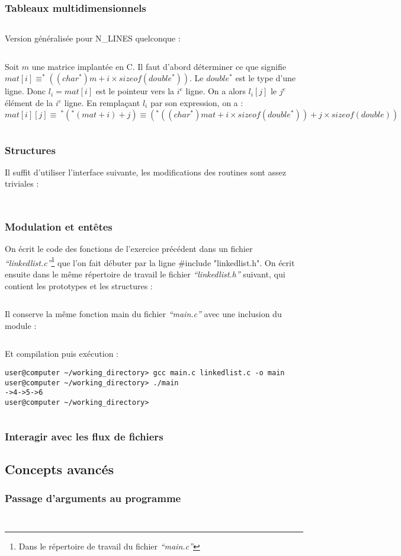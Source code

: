 \documentclass[../main.tex]{subfiles}
\begin{document}
\subsubsection{Tableaux multidimensionnels}
\inputminted{c}{solutions/tab_display_2d.c}
\newline
Version généralisée pour \textsf{N\_LINES} quelconque : 
\inputminted{c}{solutions/triangle.c}
 \newline
Soit $m$ une matrice implantée en C. Il faut d'abord déterminer ce que signifie $mat[i] \equiv ^*((char^*)m + i\times sizeof(double^*))$. Le $double^*$ est le type d'une ligne. Donc $l_{i} = mat[i]$ est le pointeur vers la $i^{e}$ ligne. On a alors $l_{i}[j]$ le $j^e$ élément de la $i^e$ ligne. En remplaçant $l_{i}$ par son expression, on a :
$$mat[i][j] \equiv\ ^*(^*(mat + i) + j) \equiv (^*((char^*)mat + i\times sizeof(double^*)) + j\times sizeof(double)) $$
\inputminted{c}{solutions/matrix.c}
\subsubsection{Structures}
 \newline
Il suffit d'utiliser l'interface suivante, les modifications des routines sont assez triviales :
\inputminted{c}{solutions/matrix.h}
\inputminted{c}{solutions/linkedlist_1.c}
\subsubsection{Modulation et entêtes}
 \newline
On écrit le code des fonctions de l'exercice précédent dans un fichier \textit{``linkedlist.c''}\footnote{Dans le répertoire de travail du fichier \textit{``main.c''}} que l'on fait débuter par la ligne \textsf{\#include "linkedlist.h"}. On écrit ensuite dans le même répertoire de travail le fichier \textit{``linkedlist.h''} suivant, qui contient les prototypes et les structures :
\inputminted{c}{solutions/linkedlist_2.h}
Il conserve la même fonction \textsf{main} du fichier \textit{``main.c''} avec une inclusion du module :
\inputminted{c}{solutions/linkedlist_2.c}
Et compilation puis exécution :
\begin{verbatim}
user@computer ~/working_directory> gcc main.c linkedlist.c -o main
user@computer ~/working_directory> ./main
->4->5->6
user@computer ~/working_directory>
\end{verbatim}
\inputminted{c}{solutions/calculatrice.c}
\subsubsection{Interagir avec les flux de fichiers}
\subsection{Concepts avancés}
\subsubsection{Passage d'arguments au programme}
\inputminted{c}{solutions/list_args.c}
\inputminted{c}{solutions/cat.c}
\end{document}
